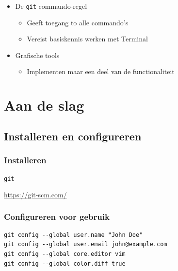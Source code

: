 \documentclass[]{beamer}
\begin{document}
\begin{frame}
    \begin{itemize}
        \item De \texttt{git} commando-regel
        \begin{itemize}
            \item Geeft toegang to alle commando's
            \item Vereist basiskennis werken met Terminal
        \end{itemize}
        \pause
        \item Grafische tools
        \begin{itemize}
            \item Implementen maar een deel van de functionaliteit
        \end{itemize}
    \end{itemize}
\end{frame}

\section{Aan de slag}

\subsection{Installeren en configureren}

\begin{frame}
    \frametitle{Installeren}

    \centering

    \begin{block}{}
    \texttt{git}
    \end{block}

    \vspace{10 mm}
    \pause

    \url{https://git-scm.com/}
\end{frame}

\begin{frame}[fragile]
    \frametitle{Configureren voor gebruik}

    \begin{block}{}
\begin{verbatim}
git config --global user.name "John Doe"
git config --global user.email john@example.com
git config --global core.editor vim
git config --global color.diff true
\end{verbatim}
    \end{block}
\end{frame}
\end{document}
